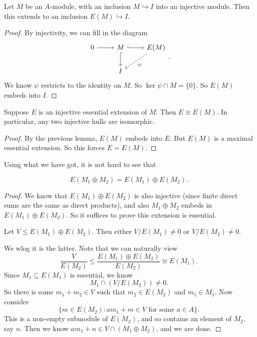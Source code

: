 \documentclass[a4paper]{article}
\begin{document}
\begin{prop}
  Let $M$ be an $A$-module, with an inclusion $M \hookrightarrow I$ into an injective module. Then this extends to an inclusion $E(M) \hookrightarrow I$.
\end{prop}

\begin{proof}
  By injectivity, we can fill in the diagram
  \[
    \begin{tikzcd}
      0 \ar[r] & M \ar[r, hook] \ar[d, hook] & E(M) \ar[dl, "\psi", dashed]\\
      & I
    \end{tikzcd}.
  \]
  We know $\psi$ restricts to the identity on $M$. So $\ker \psi \cap M = \{0\}$. So $E(M)$ embeds into $I$.
\end{proof}

\begin{prop}
  Suppose $E$ is an injective essential extension of $M$. Then $E \cong E(M)$. In particular, any two injective hulls are isomorphic.
\end{prop}

\begin{proof}
  By the previous lemma, $E(M)$ embeds into $E$. But $E(M)$ is a maximal essential extension. So this forces $E = E(M)$.
\end{proof}

Using what we have got, it is not hard to see that
\begin{prop}
  \[
    E(M_1 \oplus M_2) = E(M_1) \oplus E(M_2).
  \]
\end{prop}

\begin{proof}
  We know that $E(M_1) \oplus E(M_2)$ is also injective (since finite direct sums are the same as direct products), and also $M_1 \oplus M_2$ embeds in $E(M_1) \oplus E(M_2)$. So it suffices to prove this extension is essential.

  Let $V \leq E(M_1) \oplus E(M_2)$. Then either $V/E(M_1) \not= 0$ or $V/E(M_2) \not= 0$.

  We wlog it is the latter. Note that we can naturally view
  \[
    \frac{V}{E(M_2)} \leq \frac{E(M_1) \oplus E(M_2)}{E(M_2)} \cong E(M_1).
  \]
  Since $M_1 \subseteq E(M_1)$ is essential, we know
  \[
    M_1 \cap (V/E(M_2)) \not= 0.
  \]
  So there is some $m_1 + m_2 \in V$ such that $m_2 \in E(M_2)$ and $m_1 \in M_1$. Now consider
  \[
    \{m \in E(M_2): am_1 + m \in V\text{ for some }a \in A\}.
  \]
  This is a non-empty submodule of $E(M_2)$, and so contains an element of $M_2$, say $n$. Then we know $am_1 + n \in V \cap (M_1 \oplus M_2)$, and we are done.
\end{proof}
\end{document}
